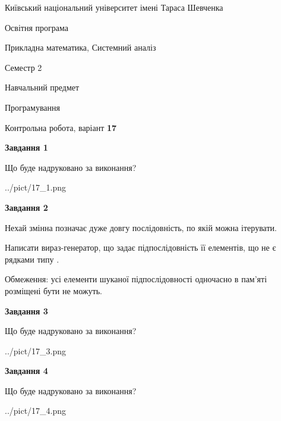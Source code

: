 \documentclass[12pt, ukrainian]{article}
\begin{document}
{{\begin {small}\par
{ \center  Київський національний університет імені Тараса Шевченка \par}
{\parbox {5 cm}{Освітня програма \hfill}{\parbox {8 cm}{Прикладна математика, Системний аналіз \hfill}}\parbox {5 cm}{\hfill Семестр 2}}\par
{\parbox {5 cm} {Навчальний предмет \hfill}\parbox {7 cm}{Програмування \hfill}\parbox {6cm}{\hfill}\par}\vspace{-7pt} \end{small}}{\center Контрольна робота, варіант  \No \textbf
{ 17 }\par}}
{
\begin {large}
{\begin {center}\textbf{Завдання 1}\end {center}}\par
Що буде надруковано за виконання?\par\par
\begin{center}
	{../pict/17_1.png}
\end{center}
\newpage

{\begin {center}\textbf{Завдання 2}\end {center}}\par
Нехай змінна  позначає дуже довгу послідовність, по якій можна ітерувати.

Написати вираз-генератор, що задає підпослідовність її елементів, що не є рядками типу .

Обмеження: усі елементи шуканої підпослідовності одночасно в пам'яті розміщені бути не можуть.\par
\newpage

{\begin {center}\textbf{Завдання 3}\end {center}}\par
Що буде надруковано за виконання?
\begin{center}
	{../pict/17_3.png}
\end{center}
\newpage

{\begin {center}\textbf{Завдання 4}\end {center}}\par
Що буде надруковано за виконання?\par
\begin{center}
	{../pict/17_4.png}
\end{center}
\newpage


\end{large}}
\end{document}
